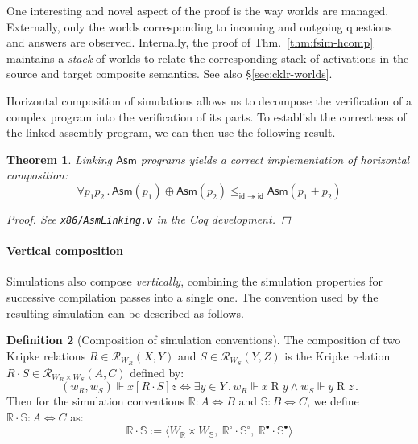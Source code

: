 \documentclass[11pt,oneside]{book}
\newtheorem{theorem}{Theorem}[chapter]
\theoremstyle{definition}
\newtheorem{definition}[theorem]{Definition}
\newcommand{\kw}[1]{\ensuremath{ \mathsf{#1} }}
\newcommand{\ifr}[1]{\mathrel{[{#1}]}}
\newcommand{\que}{\circ}         %
\newcommand{\ans}{\bullet}       %
\begin{document}
One interesting and novel aspect of the proof
is the way worlds are managed.
Externally,
only the worlds corresponding to incoming and outgoing
questions and answers are observed.
Internally,
the proof of Thm.~\ref{thm:fsim-hcomp}
maintains a \emph{stack} of
worlds
to relate the corresponding stack of activations
in the source and target composite semantics.
See also \S\ref{sec:cklr-worlds}.

Horizontal composition of simulations
allows us to decompose the verification of a complex program
into the verification of its parts.
To establish the correctness of the linked assembly program,
we can then use the following result.

\begin{theorem} \label{thm:asmlinking} %
Linking \kw{Asm} programs
yields a correct implementation of
horizontal composition:
\[
    \forall p_1 p_2 \,.\,
      \kw{Asm}(p_1) \oplus \kw{Asm}(p_2)
      \le_{\kw{id} \twoheadrightarrow \kw{id}}
      \kw{Asm}(p_1 + p_2)
\]
\begin{proof}
See \texttt{x86/AsmLinking.v} in the Coq development.
\end{proof}
\end{theorem}


\paragraph{Vertical composition} %

Simulations also compose \emph{vertically},
combining the
simulation properties for successive compilation passes
into a single one.
The convention used by the resulting simulation
can be described as follows.

\begin{definition}[Composition of simulation conventions] %
The composition of two Kripke relations
$R \in \mathcal{R}_{W_R}(X, Y)$ and
$S \in \mathcal{R}_{W_S}(Y, Z)$
is the Kripke relation
$R \cdot S \in \mathcal{R}_{W_R \times W_S}(A, C)$
defined by:
\[
  (w_R, w_S) \Vdash x \ifr{R \cdot S} z \Leftrightarrow
  \exists y \in Y \,.\,
    w_R \Vdash x \mathrel{R} y \wedge
    w_S \Vdash y \mathrel{R} z \,.
\]
Then for the simulation conventions
$\mathbb{R} : A \Leftrightarrow B$ and
$\mathbb{S} : B \Leftrightarrow C$,
we define
$\mathbb{R} \cdot \mathbb{S} : A \Leftrightarrow C$ as:
\[
  \mathbb{R} \cdot \mathbb{S} :=
  \langle
    W_\mathbb{R} \times W_\mathbb{S}, \:
    \mathbb{R}^\que \cdot \mathbb{S}^\que, \:
    \mathbb{R}^\ans \cdot \mathbb{S}^\ans
  \rangle
\]
\end{definition}
\end{document}
